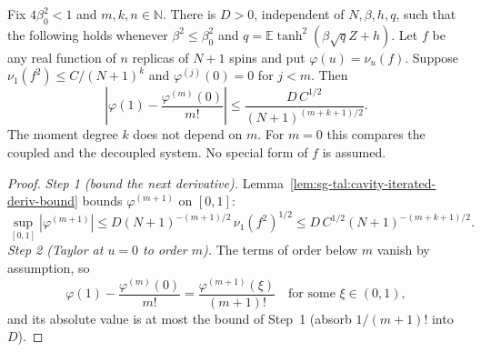 \begin{lemma}\label{lem:sg-tal:hanen-taylor-coefficient}
\leanok
{}
Fix $4\beta_0^2<1$ and $m,k,n\in\mathbb N$. There is $D>0$, independent of $N,\beta,h,q$, such that the following holds
whenever $\beta^2\le\beta_0^2$ and $q=\mathbb E\tanh^2(\beta\sqrt q Z+h)$. Let $f$ be any real function of $n$ replicas
of $N+1$ spins and put $\varphi(u)=\nu_u(f)$. Suppose $\nu_1(f^2)\le C/(N+1)^k$ and $\varphi^{(j)}(0)=0$ for $j<m$. Then
\[
 \left|\varphi(1)-\frac{\varphi^{(m)}(0)}{m!}\right|\le \frac{D\,C^{1/2}}{(N+1)^{(m+k+1)/2}}.
\]
The moment degree $k$ does not depend on $m$. For $m=0$ this compares the coupled and the decoupled system.
No special form of $f$ is assumed.
\end{lemma}
\begin{proof}
\leanok
\emph{Step 1 (bound the next derivative).} Lemma~\ref{lem:sg-tal:cavity-iterated-deriv-bound} bounds $\varphi^{(m+1)}$ on $[0,1]$:
\[
\sup_{[0,1]}|\varphi^{(m+1)}|\le D(N+1)^{-(m+1)/2}\,\nu_1(f^2)^{1/2}\le D\,C^{1/2}(N+1)^{-(m+k+1)/2}.
\]
\emph{Step 2 (Taylor at $u=0$ to order $m$).} The terms of order below $m$ vanish by assumption, so
\[
\varphi(1)-\frac{\varphi^{(m)}(0)}{m!}=\frac{\varphi^{(m+1)}(\xi)}{(m+1)!}\quad\text{for some }\xi\in(0,1),
\]
and its absolute value is at most the bound of Step~1 (absorb $1/(m+1)!$ into $D$).
\end{proof}

